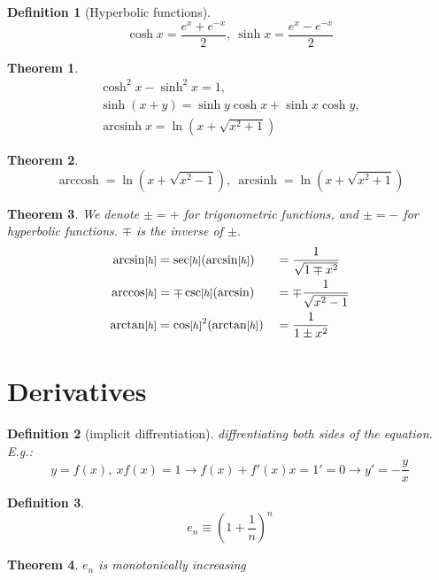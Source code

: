 \documentclass[]{article}
\newtheorem{theorem}{Theorem}[section]
\newtheorem{definition}{Definition}[section]
\newcommand\sinhx {\sinh x}
\newcommand\coshx {\cosh x}
\DeclareMathOperator{\arccosh}{arccosh}
\DeclareMathOperator{\arcsinh}{arcsinh}
\newcommand\h     {\text{\!\footnotesize$[h]$\normalsize}}
\newcommand\cl [1]    {\left ( #1 \right )}
\begin{document}
\begin{multicols}{2}
		\begin{definition}[Hyperbolic functions]
			\[ \coshx = \frac{e^x + e^{-x}}{2}, \ \sinhx = \frac{e^x - e^{-x}}{2} \]
		\end{definition}
		
		\begin{theorem}
			\begin{gather*}
				\cosh^2x - \sinh^2x = 1, \\
				\sinh(x + y) = \sinh y \coshx + \sinhx \cosh y, \\ 
				\arcsinh x = \ln(x + \sqrt{x^2 + 1})
			\end{gather*}
		\end{theorem}
		
		\begin{theorem}
			\[ \arccosh = \ln(x + \sqrt{x^2 - 1}), \ \arcsinh = \ln(x + \sqrt{x^2 + 1}) \]
		\end{theorem}
		
		\begin{theorem}
			We denote $\pm = +$ for trigonometric functions, and $\pm = -$ for hyperbolic functions. $\mp$ is the inverse of $\pm$.
			\begin{alignat*}{9}
				\arcsin\h &= \sec\h(\arcsin\h) &&= \frac{1}{\sqrt{1 \mp x^2}} \\
				\arccos\h &= \mp\csc\h(\arcsin) &&= \mp \frac{1}{\sqrt{x^2 - 1}} \\
				\arctan\h &= \cos\h^2(\arctan\h) &&= \frac{1}{1 \pm x^2}
			\end{alignat*}
		\end{theorem}
		
		
		
		\section{Derivatives}
		
		\begin{definition}[implicit diffrentiation]
			diffrentiating both sides of the equation. E.g.: 
			\[ y = f(x), \ xf(x) = 1 \to f(x) + f'(x)x = 1' = 0 \to y' = -\frac{y}{x} \]
		\end{definition}
		
		\begin{definition}
			\[ e_n \equiv \cl{1 + \frac{1}{n}}^n \]
		\end{definition}
		
		\begin{theorem}
			$e_n$ is monotonically increasing
		\end{theorem}
		

\end{multicols}
\end{document}
